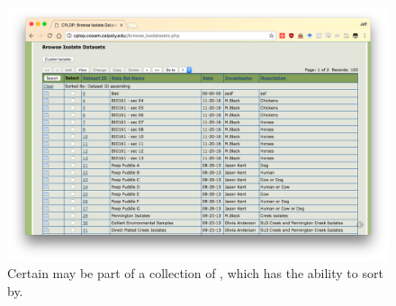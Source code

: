 \begin{figure}
    \centering
    \includegraphics[width=\frontendwidth]{figures/frontend/browse-isolate-datasets}
    \caption{Certain \isols{} may be part of a collection of \isols{}, which \cplop{} has the ability to sort by.}
    \label{fig:browse-isolate-datasets}
\end{figure}